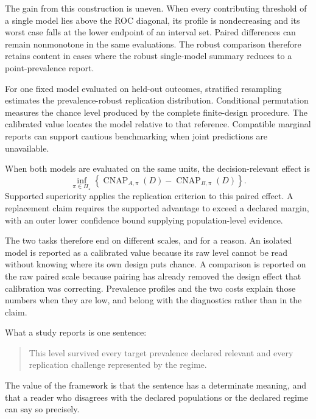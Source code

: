 \documentclass[11pt]{article}
\newcommand{\CNAP}{\operatorname{CNAP}}
\newcommand{\PSet}{\Pi_\star}
\theoremstyle{remark}
\begin{document}
The gain from this construction is uneven. When every contributing threshold of a single model lies above the ROC diagonal, its profile is nondecreasing and its worst case falls at the lower endpoint of an interval set. Paired differences can remain nonmonotone in the same evaluations. The robust comparison therefore retains content in cases where the robust single-model summary reduces to a point-prevalence report.

For one fixed model evaluated on held-out outcomes, stratified resampling estimates the prevalence-robust replication distribution. Conditional permutation measures the chance level produced by the complete finite-design procedure. The calibrated value locates the model relative to that reference. Compatible marginal reports can support cautious benchmarking when joint predictions are unavailable.

When both models are evaluated on the same units, the decision-relevant effect is
\[
\inf_{\pi\in\PSet}
\left\{
\CNAP_{A,\pi}(D)-\CNAP_{B,\pi}(D)
\right\}.
\]
Supported superiority applies the replication criterion to this paired effect. A replacement claim requires the supported advantage to exceed a declared margin, with an outer lower confidence bound supplying population-level evidence.

The two tasks therefore end on different scales, and for a reason. An isolated model is reported as a calibrated value because its raw level cannot be read without knowing where its own design puts chance. A comparison is reported on the raw paired scale because pairing has already removed the design effect that calibration was correcting. Prevalence profiles and the two costs explain those numbers when they are low, and belong with the diagnostics rather than in the claim.

What a study reports is one sentence:

\begin{quote}
This level survived every target prevalence declared relevant and every replication challenge represented by the regime.
\end{quote}

The value of the framework is that the sentence has a determinate meaning, and that a reader who disagrees with the declared populations or the declared regime can say so precisely.
\end{document}
